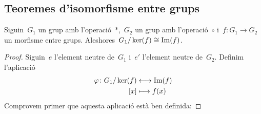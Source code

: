 \documentclass[../../main.tex]{subfiles}
\begin{document}
    \subsection{Teoremes d'isomorfisme entre grups}
    \begin{theorem}
        \label{thm:Teorema-fonamental-dels-isomorfismes}%
            Siguin~\(G_{1}\) un grup amb l'operació~\(\ast\),~\(G_{2}\) un grup amb l'operació~\(\circ\) i~\(f\colon G_{1}\to G_{2}\) un morfisme entre grups.
            Aleshores~\(G_{1}/\operatorname{ker}(f)\cong\operatorname{Im}(f)\).
    \end{theorem}
    \begin{proof}
        Siguin~\(e\) l'element neutre de~\(G_{1}\) i~\(e'\) l'element neutre de~\(G_{2}\).
        Definim l'aplicació
        \begin{align}
        \label{thm:Teorema-fonamental-dels-isomorfismes:eq1}
        \varphi\colon G_{1}/\operatorname{ker}(f)&\longleftrightarrow\operatorname{Im}(f)\\
        [x]&\longmapsto f(x)\nonumber
        \end{align}
        Comprovem primer que aquesta aplicació està ben definida:


\end{proof}
\end{document}
